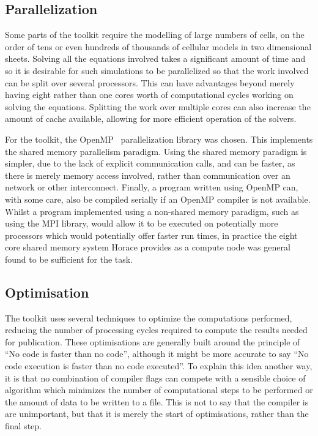 \subsection{Parallelization}

Some parts of the toolkit require the modelling of large numbers of cells, on
the order of tens or even hundreds of thousands of cellular models in two
dimensional sheets.  Solving all the equations involved takes a significant
amount of time and so it is desirable for such simulations to be parallelized so
that the work involved can be split over several processors.  This can have
advantages beyond merely having eight rather than one cores worth of
computational cycles working on solving the equations.  Splitting the work over
multiple cores can also increase the amount of cache available, allowing for
more efficient operation of the solvers.

For the toolkit, the OpenMP~\cite{OpenMP} parallelization library was chosen.
This implements the shared memory parallelism paradigm.  Using the shared memory
paradigm is simpler, due to the lack of explicit communication calls, and can be
faster, as there is merely memory access involved, rather than communication
over an network or other interconnect.  Finally, a program written using OpenMP
can, with some care, also be compiled serially if an OpenMP compiler is not
available.  Whilst a program implemented using a non-shared memory paradigm,
such as using the MPI library, would allow it to be executed on potentially more
processors which would potentially offer faster run times, in practice the eight
core shared memory system Horace provides as a compute node was general found to
be sufficient for the task.

\subsection{Optimisation}

The toolkit uses several techniques to optimize the computations performed,
reducing the number of processing cycles required to compute the results needed
for publication.  These optimisations are generally built around the principle
of ``No code is faster than no code'', although it might be more accurate to say
``No code execution is faster than no code executed''.  To explain this idea
another way, it is that no combination of compiler flags can compete with a
sensible choice of algorithm which minimizes the number of computational steps
to be performed or the amount of data to be written to a file.  This is not to
say that the compiler is are unimportant, but that it is merely the start of
optimisations, rather than the final step.

